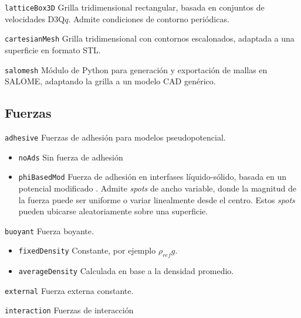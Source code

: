\texttt{latticeBox3D}\: Grilla tridimensional rectangular, basada en conjuntos de velocidades D3Q$q$. Admite condiciones de contorno peri\'odicas.
\medskip

\texttt{cartesianMesh}\: Grilla tridimensional con contornos escalonados, adaptada a una superficie en formato STL. 
\medskip

\texttt{salomesh}\: M\'odulo de Python para generaci\'on y exportaci\'on de mallas en SALOME, adaptando la grilla a un modelo CAD gen\'erico.
\medskip


\subsection{Fuerzas}

\texttt{adhesive}\: Fuerzas de adhesi\'on para modelos pseudopotencial.

\begin{itemize}
	\renewcommand{\labelitemi}{\hspace{2cm}}
	\setlength\itemsep{0.2em}
	\item \texttt{noAds}\: Sin fuerza de adhesi\'on
	\item \texttt{phiBasedMod}\: Fuerza de adhesi\'on en interfases l\'iquido-s\'olido, basada en un potencial modificado \cite{li_contact_2014}. Admite \emph{spots} de ancho variable, donde la magnitud de la fuerza puede ser uniforme o variar linealmente desde el centro. Estos \emph{spots} pueden ubicarse aleatoriamente sobre una superficie.
\end{itemize}
\medskip

\texttt{buoyant}\: Fuerza boyante. 

\begin{itemize}
	\renewcommand{\labelitemi}{\:}
	\item \texttt{fixedDensity}\: Constante, por ejemplo $\rho_{ref}g$.
	\item \texttt{averageDensity}\: Calculada en base a la densidad promedio.
\end{itemize}
\medskip

\texttt{external}\: Fuerza externa constante.
\medskip

\texttt{interaction}\: Fuerzas de interacci\'on

